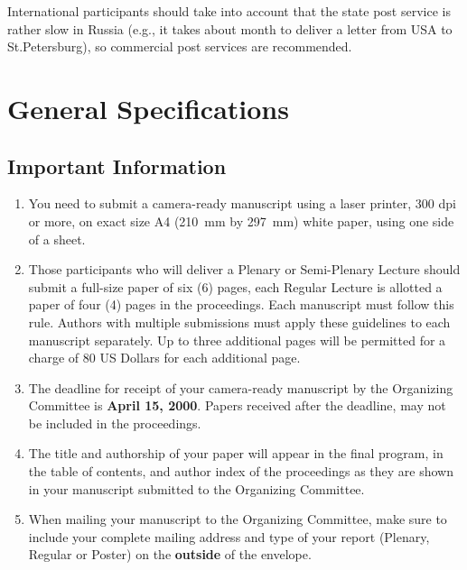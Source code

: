 
International participants should take into
account that the state post service is rather
slow in Russia (e.g., it takes about month
to deliver a letter from USA to St.Petersburg),
so commercial post services are recommended.

\section{General Specifications}

\subsection{Important Information}

\begin{enumerate}
\item You need to submit a camera-ready manuscript
using a laser printer, 300 dpi or more,
on exact size A4 (210~mm by 297~mm) white paper, using one side
of a sheet.

\item  Those participants who will deliver a Plenary
or Semi-Plenary Lecture should submit a full-size
paper of six (6) pages, each Regular Lecture is allotted
a paper of four (4) pages in the proceedings.
Each manuscript must follow this rule.  Authors with
multiple submissions must apply these guidelines to each
manuscript separately.
Up to three additional pages will be permitted for
a charge of 80 US Dollars for each additional page.

\item The deadline for receipt of your camera-ready
manuscript by the Organizing Committee is
{\bf April 15, 2000}.
Papers received after the deadline, may not be
included in the proceedings.

\item The title and authorship of your paper will
appear in the final program, in the table of contents,
and author index of the proceedings as they are
shown in your manuscript submitted to
the Organizing Committee.

\item When mailing your manuscript to the
Organizing Committee, make sure to include your
complete mailing address and type of your report
(Plenary, Regular or Poster)
on the {\bf outside} of the envelope.
\end{enumerate}

